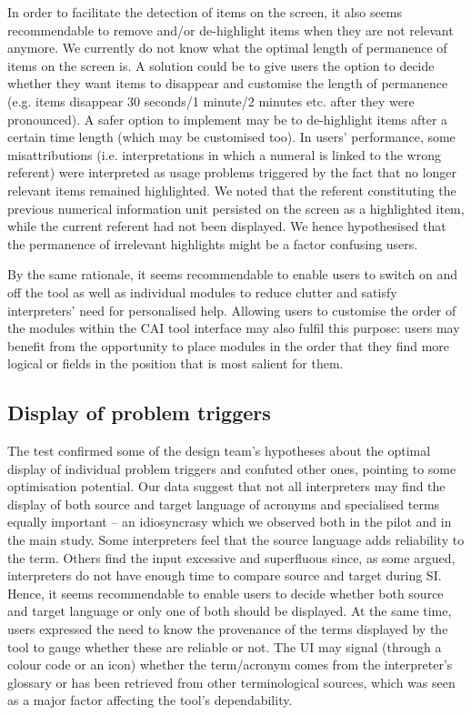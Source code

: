 In order to facilitate the detection of items on the screen, it also seems recommendable to remove and/or de-highlight items when they are not relevant anymore. We currently do not know what the optimal length of permanence of items on the screen is. A solution could be to give users the option to decide whether they want items to disappear and customise the length of permanence (e.g. items disappear 30 seconds/1 minute/2 minutes etc. after they were pronounced). A safer option to implement may be to de-highlight items after a certain time length (which may be customised too). In users’ performance, some misattributions (i.e. interpretations in which a numeral is linked to the wrong referent) were interpreted as usage problems triggered by the fact that no longer relevant items remained highlighted. We noted that the referent constituting the previous numerical information unit persisted on the screen as a highlighted item, while the current referent had not been displayed. We hence hypothesised that the permanence of irrelevant highlights might be a factor confusing users.

By the same rationale, it seems recommendable to enable users to switch on and off the tool as well as individual modules to reduce clutter and satisfy interpreters’ need for personalised help. Allowing users to customise the order of the modules within the CAI tool interface may also fulfil this purpose: users may benefit from the opportunity to place modules in the order that they find more logical or fields in the position that is most salient for them.





\subsection{Display of problem triggers}

The test confirmed some of the design team’s hypotheses about the optimal display of individual problem triggers and confuted other ones, pointing to some optimisation potential. Our data suggest that not all interpreters may find the display of both source and target language of acronyms and specialised terms equally important -- an idiosyncrasy which we observed both in the pilot and in the main study. Some interpreters feel that the source language adds reliability to the term. Others find the input excessive and superfluous since, as some argued, interpreters do not have enough time to compare source and target during SI. Hence, it seems recommendable to enable users to decide whether both source and target language or only one of both should be displayed. At the same time, users expressed the need to know the provenance of the terms displayed by the tool to gauge whether these are reliable or not. The UI may signal (through a colour code or an icon) whether the term/acronym comes from the interpreter’s glossary or has been retrieved from other terminological sources, which was seen as a major factor affecting the tool’s dependability.

